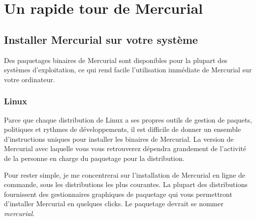 \chapter{Un rapide tour de Mercurial}
\label{chap:tour-basic}

\section{Installer Mercurial sur votre système}
\label{sec:tour:install}

Des paquetages binaires de Mercurial sont disponibles pour la plupart
des systèmes d'exploitation, ce qui rend facile l'utilisation immédiate
de Mercurial sur votre ordinateur.

\subsection{Linux}

Parce que chaque distribution de Linux a ses propres outils de gestion
de paquets, politiques et rythmes de développements, il est difficile de
donner un ensemble d'instructions uniques pour installer les binaires de
Mercurial. La version de Mercurial avec laquelle vous vous retrouverez
dépendra grandement de l'activité de la personne en charge du paquetage
pour la distribution.

Pour rester simple, je me concentrerai sur l'installation de Mercurial
en ligne de commande, sous les distributions les plus courantes. La 
plupart des distributions fournissent des gestionnaires graphiques de
paquetage qui vous permettront d'installer Mercurial en quelques clicks.
Le paquetage devrait se nommer \textit{mercurial}.

